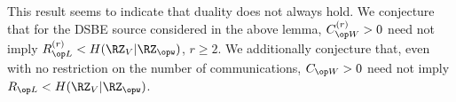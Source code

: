  This result seems to indicate that duality does not always hold. We conjecture that for the DSBE  source considered in the above lemma, $\wskc^{(r)}>0$ need not imply $\rl^{(r)} < H(\RZ_V|\RZ_{\opw})$, $r\geq 2$. We additionally conjecture that, even with no restriction on the number of communications, $\wskc>0$ need not imply $\rl < H(\RZ_V|\RZ_{\opw})$.   

